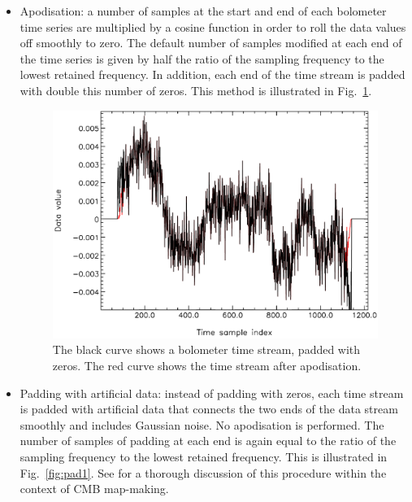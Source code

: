 \documentclass[useAMS,usenatbib,nofootinbib]{mn2e}
\begin{document}
\begin{itemize}
\item Apodisation: a number of samples at the start and end of each
bolometer time series are multiplied by a cosine function in order to
roll the data values off smoothly to zero. The default number of samples
modified at each end of the time series is given by half the ratio of the
sampling frequency to the lowest retained frequency. In addition, each
end of the time stream is padded with double this number of zeros. This
method is illustrated in Fig.~\ref{fig:pad2}.

\begin{figure}
\centering
\includegraphics[width=\linewidth]{pad2.pdf}
\caption{The black curve shows a bolometer time stream, padded
with zeros. The red curve shows the time stream after apodisation.}
\label{fig:pad2}
\end{figure}

\item Padding with artificial data: instead of padding with zeros,
each time stream is padded with artificial data that connects the two
ends of the data stream smoothly and includes Gaussian noise. No
apodisation is performed. The number of samples of padding at each end
is again equal to the ratio of the sampling frequency to the lowest
retained frequency.  This is illustrated in Fig.~\ref{fig:pad1}. See
\citet{stompor2002} for a thorough discussion of this procedure within
the context of CMB map-making.


\end{itemize}
\end{document}

